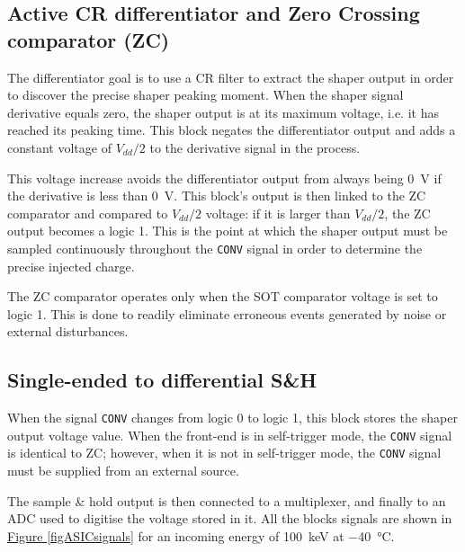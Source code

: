 
\subsection{Active CR differentiator and Zero Crossing comparator (ZC)}
\label{zeroCrossing}
The differentiator goal is to use a CR filter to extract the shaper output in order to discover the precise shaper peaking moment. When the shaper signal derivative equals zero, the shaper output is at its maximum voltage, i.e. it has reached its peaking time. This block negates the differentiator output and adds a constant voltage of $V_{dd}/2$ to the derivative signal in the process.

This voltage increase avoids the differentiator output from always being \SI{0}{V} if the derivative is less than \SI{0}{V}. This block's output is then linked to the ZC comparator and compared to $V_{dd}/2$ voltage: if it is larger than $V_{dd}/2$, the ZC output becomes a logic 1. This is the point at which the shaper output must be sampled continuously throughout the \texttt{CONV} signal in order to determine the precise injected charge.

\par
The ZC comparator operates only when the SOT comparator voltage is set to logic 1. This is done to readily eliminate erroneous events generated by noise or external disturbances.


\subsection{Single-ended to differential S\&H}
When the signal \texttt{CONV} changes from logic 0 to logic 1, this block stores the shaper output voltage value. When the front-end is in self-trigger mode, the \texttt{CONV} signal is identical to ZC; however, when it is not in self-trigger mode, the \texttt{CONV} signal must be supplied from an external source.

\par
The sample \& hold output is then connected to a multiplexer, and finally to an ADC used to digitise the voltage stored in it. All the blocks signals are shown in \hyperref[figASICsignals]{Figure \ref{figASICsignals}} for an incoming energy of \SI{100}{\kilo\electronvolt} at \SI{-40}{\celsius}.

